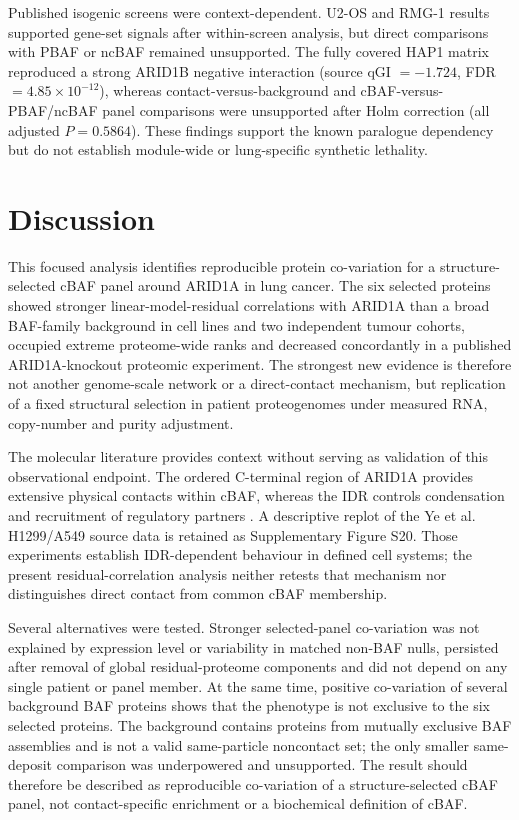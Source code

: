 \documentclass[journal=jprobs,manuscript=article,layout=traditional]{achemso}
\begin{document}
Published isogenic screens were context-dependent. U2-OS and RMG-1 results supported gene-set signals after within-screen analysis, but direct comparisons with PBAF or ncBAF remained unsupported. The fully covered HAP1 matrix reproduced a strong ARID1B negative interaction (source qGI $=-1.724$, FDR $=4.85\times10^{-12}$), whereas contact-versus-background and cBAF-versus-PBAF/ncBAF panel comparisons were unsupported after Holm correction (all adjusted $P=0.5864$). These findings support the known paralogue dependency but do not establish module-wide or lung-specific synthetic lethality.

\section{Discussion}

This focused analysis identifies reproducible protein co-variation for a structure-selected cBAF panel around ARID1A in lung cancer. The six selected proteins showed stronger linear-model-residual correlations with ARID1A than a broad BAF-family background in cell lines and two independent tumour cohorts, occupied extreme proteome-wide ranks and decreased concordantly in a published ARID1A-knockout proteomic experiment. The strongest new evidence is therefore not another genome-scale network or a direct-contact mechanism, but replication of a fixed structural selection in patient proteogenomes under measured RNA, copy-number and purity adjustment.

The molecular literature provides context without serving as validation of this observational endpoint. The ordered C-terminal region of ARID1A provides extensive physical contacts within cBAF, whereas the IDR controls condensation and recruitment of regulatory partners \citep{patil2023,ye2026}. A descriptive replot of the Ye et al. H1299/A549 source data is retained as Supplementary Figure S20. Those experiments establish IDR-dependent behaviour in defined cell systems; the present residual-correlation analysis neither retests that mechanism nor distinguishes direct contact from common cBAF membership.

Several alternatives were tested. Stronger selected-panel co-variation was not explained by expression level or variability in matched non-BAF nulls, persisted after removal of global residual-proteome components and did not depend on any single patient or panel member. At the same time, positive co-variation of several background BAF proteins shows that the phenotype is not exclusive to the six selected proteins. The background contains proteins from mutually exclusive BAF assemblies and is not a valid same-particle noncontact set; the only smaller same-deposit comparison was underpowered and unsupported. The result should therefore be described as reproducible co-variation of a structure-selected cBAF panel, not contact-specific enrichment or a biochemical definition of cBAF.
\end{document}
